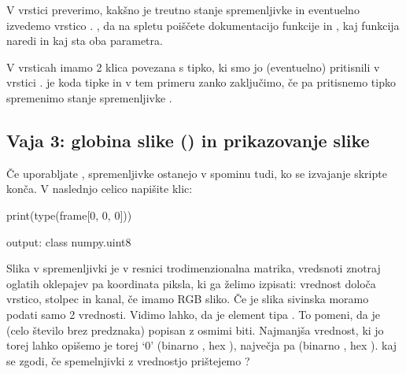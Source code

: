 \documentclass[letterpaper,10pt,english]{sphinxmanual}
\begin{document}
\sphinxAtStartPar
V vrstici  preverimo, kakšno je treutno stanje spremenljivke  in eventuelno izvedemo vrstico . , da na spletu poiščete dokumentacijo  funkcije  in , kaj funkcija naredi in kaj sta oba parametra.

\begin{sphinxVerbatim}[commandchars=\\\{\}]
       
       
           
\end{sphinxVerbatim}

\sphinxAtStartPar
V vrsticah  imamo 2 klica povezana s tipko, ki smo jo (eventuelno) pritisnili v vrstici .  je koda tipke  in v tem primeru zanko zaključimo, če pa pritisnemo tipko  spremenimo  stanje spremenljivke .


\subsection{Vaja 3: globina slike () in prikazovanje slike}
\label{\detokenize{uvod_py_opencv:vaja-3-globina-slike-image-depth-in-prikazovanje-slike}}
\sphinxAtStartPar
Če uporabljate , spremenljivke ostanejo v spominu tudi, ko se izvajanje skripte konča. V naslednjo celico napišite klic:

\begin{sphinxVerbatim}[commandchars=\\\{\}]
print(type(frame[0, 0, 0]))

output: \PYGZlt{}class \PYGZsq{}numpy.uint8\PYGZsq{}\PYGZgt{}
\end{sphinxVerbatim}

\sphinxAtStartPar
Slika v spremenljivki  je v resnici trodimenzionalna matrika, vredsnoti znotraj oglatih oklepajev pa koordinata piksla, ki ga želimo izpisati:  vrednost določa vrstico,  stolpec in  kanal, če imamo RGB sliko. Če je slika sivinska moramo podati samo 2 vrednosti. Vidimo lahko, da je element tipa . To pomeni, da je  (celo število brez predznaka) popisan z osmimi biti. Najmanjša vrednost, ki jo torej lahko opišemo je torej ‘0’ (binarno , hex ), največja pa  (binarno , hex ).  kaj se zgodi, če  spemelnjivki z vrednostjo  prištejemo ?
\end{document}
